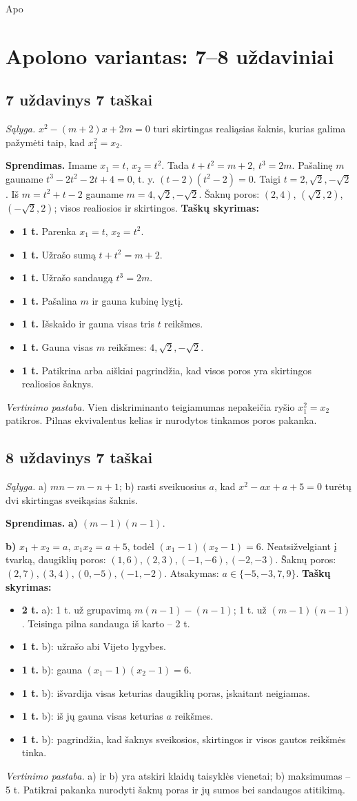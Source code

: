 Apo\documentclass[11pt,a4paper]{article}
\newcommand{\uzd}[3]{\subsection*{#1 uždavinys \hfill #2 taškai}\textit{Sąlyga.} #3\par}
\newcommand{\kriterijai}{\textbf{Taškų skyrimas:}}
\newcommand{\balas}[2]{\item \textbf{#1 t.} #2}
\begin{document}
\section*{Apolono variantas: 7--8 uždaviniai}
\uzd{7}{7}{$x^2-(m+2)x+2m=0$ turi skirtingas realiąsias šaknis, kurias galima pažymėti taip, kad $x_1^2=x_2$.}
\textbf{Sprendimas.} Imame $x_1=t$, $x_2=t^2$. Tada $t+t^2=m+2$, $t^3=2m$. Pašalinę $m$ gauname $t^3-2t^2-2t+4=0$, t. y. $(t-2)(t^2-2)=0$. Taigi $t=2,\sqrt2,-\sqrt2$. Iš $m=t^2+t-2$ gauname $m=4,\sqrt2,-\sqrt2$. Šaknų poros: $(2,4)$, $(\sqrt2,2)$, $(-\sqrt2,2)$; visos realiosios ir skirtingos.
\kriterijai\begin{itemize}
\balas{1}{Parenka $x_1=t$, $x_2=t^2$.}
\balas{1}{Užrašo sumą $t+t^2=m+2$.}
\balas{1}{Užrašo sandaugą $t^3=2m$.}
\balas{1}{Pašalina $m$ ir gauna kubinę lygtį.}
\balas{1}{Išskaido ir gauna visas tris $t$ reikšmes.}
\balas{1}{Gauna visas $m$ reikšmes: $4,\sqrt2,-\sqrt2$.}
\balas{1}{Patikrina arba aiškiai pagrindžia, kad visos poros yra skirtingos realiosios šaknys.}
\end{itemize}
\textit{Vertinimo pastaba.} Vien diskriminanto teigiamumas nepakeičia ryšio $x_1^2=x_2$ patikros. Pilnas ekvivalentus kelias ir nurodytos tinkamos poros pakanka.
\uzd{8}{7}{a) $mn-m-n+1$; b) rasti sveikuosius $a$, kad $x^2-ax+a+5=0$ turėtų dvi skirtingas sveikąsias šaknis.}
\textbf{Sprendimas.} \textbf{a)} $(m-1)(n-1)$.\par\textbf{b)} $x_1+x_2=a$, $x_1x_2=a+5$, todėl $(x_1-1)(x_2-1)=6$. Neatsižvelgiant į tvarką, daugiklių poros: $(1,6),(2,3),(-1,-6),(-2,-3)$. Šaknų poros: $(2,7),(3,4),(0,-5),(-1,-2)$. Atsakymas: $a\in\{-5,-3,7,9\}$.
\kriterijai\begin{itemize}
\balas{2}{a): 1 t. už grupavimą $m(n-1)-(n-1)$; 1 t. už $(m-1)(n-1)$. Teisinga pilna sandauga iš karto -- 2 t.}
\balas{1}{b): užrašo abi Vijeto lygybes.}
\balas{1}{b): gauna $(x_1-1)(x_2-1)=6$.}
\balas{1}{b): išvardija visas keturias daugiklių poras, įskaitant neigiamas.}
\balas{1}{b): iš jų gauna visas keturias $a$ reikšmes.}
\balas{1}{b): pagrindžia, kad šaknys sveikosios, skirtingos ir visos gautos reikšmės tinka.}
\end{itemize}
\textit{Vertinimo pastaba.} a) ir b) yra atskiri klaidų taisyklės vienetai; b) maksimumas -- 5 t. Patikrai pakanka nurodyti šaknų poras ir jų sumos bei sandaugos atitikimą.
\end{document}
